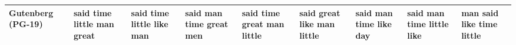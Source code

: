 \documentclass[11pt,a4paper]{article}
\begin{document}
\begin{appendices}
\begin{table*}[htp]
\begin{tiny}
\begin{tabular}{|p{}|p{}|p{}|p{}|p{}|p{}|p{}|p{}|p{}|}
Gutenberg (PG-19) & said \newline time \newline little \newline man \newline great & said \newline time \newline little \newline like \newline man & said \newline man \newline time \newline great \newline men & said \newline time \newline great \newline man \newline little & said \newline great \newline like \newline man \newline little & said \newline man \newline time \newline like \newline day & said \newline man \newline time \newline little \newline like & man \newline said \newline like \newline time \newline little\\\hline

\end{tabular}
\end{tiny}
\end{table*}
\end{appendices}
\end{document}
